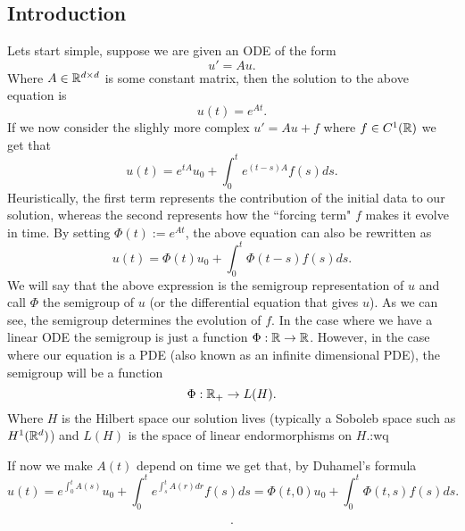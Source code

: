 \documentclass[12pt]{article}
\begin{document}
\begin{CJK*}{UTF8}{gbsn}
\section{Introduction}
Lets start simple, suppose we are given an ODE of the form 
\begin{equation*}
    u'=Au.
\end{equation*}
Where $A\in {\mathbb R}^{d\times d}$ is some constant matrix, then the solution to the above equation is 
\begin{equation*}
  u(t)=e^{At}.
\end{equation*}
If we now consider the slighly more complex $u'=Au+f$ where  $f\in C^1({\mathbb R})$ we get that
\begin{equation*}
  u(t)=e^{tA}u_0+\int_{0}^t e^{(t-s)A}f(s) ds.
\end{equation*}    
Heuristically, the first term represents the contribution of the initial data to our solution, whereas the second represents how the ``forcing term" $f$ makes it evolve in time. By setting $\Phi(t):=e^{At}$,
the above equation can also be rewritten as 
\begin{equation*}
    u(t)=\Phi(t)u_0+\int_{0}^t\Phi(t-s)f(s) ds.
\end{equation*}
   We will say that the above expression is the semigroup representation of $u$ and call $\Phi$ the semigroup of $u$ (or the differential equation that gives $u$). As we can see, 
   the semigroup determines the evolution of $f$. In the case where we have a linear ODE the semigroup is just a function $\Phi:{\mathbb R}\to{\mathbb R}$. However, in the case where our 
    equation is a PDE (also known as an infinite dimensional PDE), the semigroup will be a function 
    \begin{equation*}
        \Phi:{\mathbb R}_+\to L(H).
    \end{equation*}
        Where $H$ is the Hilbert space our solution lives  (typically a Soboleb space such as $H^1({\mathbb R}^d)$) and  $L(H)$ is the space of linear endormorphisms on $H$.:wq




If now we make $A(t)$ depend on time we get that, by Duhamel's formula 
\begin{equation*}
  u(t)=e^{\int_{0}^tA(s)}u_0+\int_{0}^t e^{\int_{s}^t A(r)dr}f(s) ds=\Phi(t,0)u_0+\int_{0}^t \Phi(t,s)f(s)ds.
\end{equation*}



 \begin{equation*}
    .
\end{equation*}
    
    

\end{CJK*}




\end{document}
